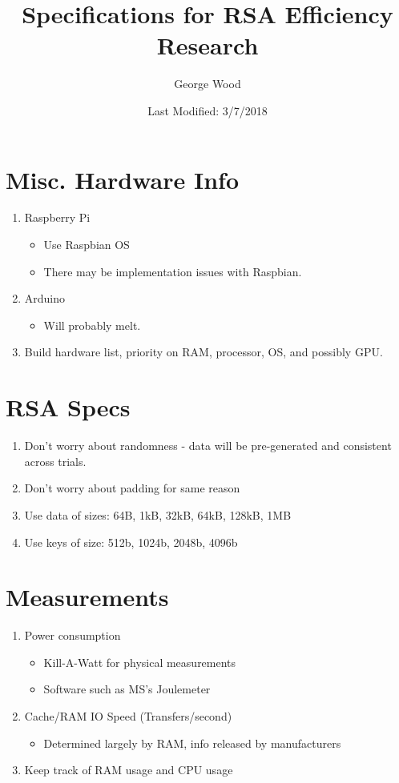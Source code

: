 \documentclass[11pt]{article}
\title{Specifications for RSA Efficiency Research}
\author{George Wood}
\date{Last Modified: 3/7/2018}
\begin{document}
\maketitle

\thispagestyle{empty}

\section{Misc. Hardware Info}

\begin{enumerate}
\item{Raspberry Pi
	\begin{itemize}
	\item{Use Raspbian OS}
	\item{There may be implementation issues with Raspbian.}
	\end{itemize}
	}
\item{Arduino
	\begin{itemize}
	\item{Will probably melt.}
	\end{itemize}
	}
\item{Build hardware list, priority on RAM, processor, OS, and possibly GPU.
	}
\end{enumerate}


\section{RSA Specs}

\begin{enumerate}
	\item{Don't worry about randomness - data will be pre-generated and consistent across trials.}
	\item{Don't worry about padding for same reason}
	\item{Use data of sizes: 64B, 1kB, 32kB, 64kB, 128kB, 1MB}
	\item{Use keys of size: 512b, 1024b, 2048b, 4096b}
\end{enumerate}

\section{Measurements}

\begin{enumerate}
\item{Power consumption
	\begin{itemize}
	\item{Kill-A-Watt for physical measurements}
	\item{Software such as MS's Joulemeter}
	\end{itemize}
	}
\item{Cache/RAM IO Speed (Transfers/second)
	\begin{itemize}
	\item{Determined largely by RAM, info released by manufacturers}
	\end{itemize}
	}
\item{Keep track of RAM usage and CPU usage}
	
\end{enumerate}
\end{document}
